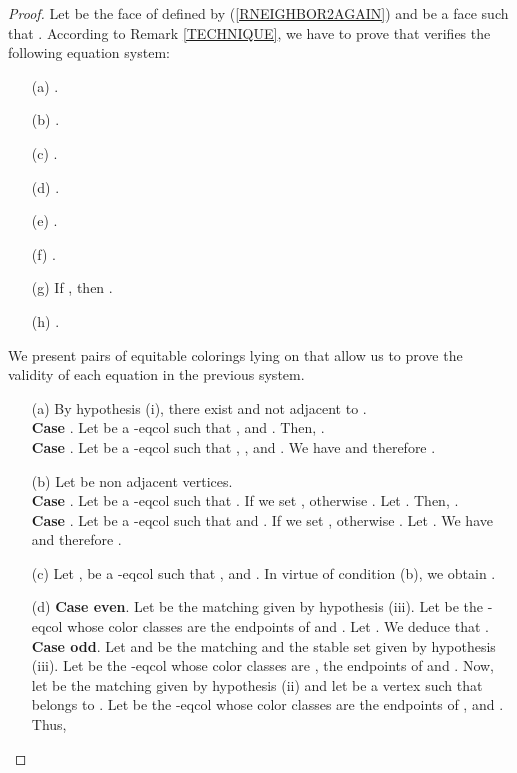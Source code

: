 \begin{proof}
Let  be the face of  defined by (\ref{RNEIGHBOR2AGAIN}) and
 be a face such that .
According to Remark \ref{TECHNIQUE}, we have to prove that  verifies the following equation system: 
\begin{enumerate}
\item[(a)] .
\item[(b)] .
\item[(c)] .
\item[(d)] .
\item[(e)] .
\item[(f)] .
\item[(g)] If , then .
\item[(h)] .
\end{enumerate}
We present pairs of equitable colorings lying on  that allow us to
prove the validity of each equation in the previous system.
\begin{enumerate}
\item[(a)] By hypothesis (i), there exist  and  not adjacent to .\\
\textbf{Case }. Let  be a -eqcol such that
,  and .
Then, .\\
\textbf{Case }. Let  be a -eqcol such that , ,  and . We have  and
therefore .
\item[(b)] Let  be non adjacent vertices.\\
\textbf{Case }. Let  be a -eqcol such that . If
 we set , otherwise . Let .
Then, .\\
\textbf{Case }. Let  be a -eqcol such that  and . If  we set
, otherwise . Let .
We have  and therefore
.
\item[(c)] Let ,  be a -eqcol such that ,  and
. In virtue of condition (b), we obtain .
\item[(d)]  \textbf{Case  even}. Let  be the matching given by hypothesis (iii). Let  be the
-eqcol whose color classes are the endpoints of  and .
Let . We deduce that
.\\
\textbf{Case  odd}. Let  and  be the matching and the stable set given by hypothesis (iii). Let
 be the -eqcol whose color classes are , the endpoints of  and .
Now, let  be the matching given by hypothesis (ii) and let  be a vertex such that  belongs to .
Let  be the -eqcol
whose color classes are the endpoints of ,  and
.
Thus,


\end{enumerate}
\end{proof}
